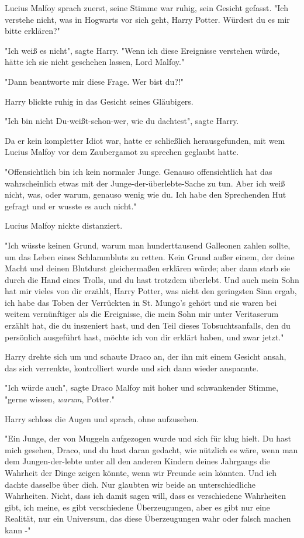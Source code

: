 {Lucius Malfoy sprach zuerst, seine Stimme war ruhig, sein Gesicht gefasst. "Ich verstehe nicht, was in Hogwarts vor sich geht, Harry Potter. Würdest du es mir bitte erklären?"

"Ich weiß es nicht", sagte Harry. "Wenn ich diese Ereignisse verstehen würde, hätte ich sie nicht geschehen lassen, Lord Malfoy."

"Dann beantworte mir diese Frage. Wer bist du?!"

Harry blickte ruhig in das Gesicht seines Gläubigers.

"Ich bin nicht Du-weißt-schon-wer, wie du dachtest", sagte Harry.

Da er kein kompletter Idiot war, hatte er schließlich herausgefunden, mit wem Lucius Malfoy vor dem Zaubergamot zu sprechen geglaubt hatte.

"Offensichtlich bin ich kein normaler Junge. Genauso offensichtlich hat das wahrscheinlich etwas mit der Junge-der-überlebte-Sache zu tun. Aber ich weiß nicht, was, oder warum, genauso wenig wie du. Ich habe den Sprechenden Hut gefragt und er wusste es auch nicht."

Lucius Malfoy nickte distanziert.

"Ich wüsste keinen Grund, warum man hunderttausend Galleonen zahlen sollte, um das Leben eines Schlammbluts zu retten. Kein Grund außer einem, der deine Macht und deinen Blutdurst gleichermaßen erklären würde; aber dann starb sie durch die Hand eines Trolls, und du hast trotzdem überlebt. Und auch mein Sohn hat mir vieles von dir erzählt, Harry Potter, was nicht den geringsten Sinn ergab, ich habe das Toben der Verrückten in St. Mungo's gehört und sie waren bei weitem vernünftiger als die Ereignisse, die mein Sohn mir unter Veritaserum erzählt hat, die du inszeniert hast, und den Teil dieses Tobsuchtsanfalls, den du persönlich ausgeführt hast, möchte ich von dir erklärt haben, und zwar jetzt."

Harry drehte sich um und schaute Draco an, der ihn mit einem Gesicht ansah, das sich verrenkte, kontrolliert wurde und sich dann wieder anspannte.

"Ich würde auch", sagte Draco Malfoy mit hoher und schwankender Stimme, "gerne wissen, \emph{warum}, Potter."

Harry schloss die Augen und sprach, ohne aufzusehen.

"Ein Junge, der von Muggeln aufgezogen wurde und sich für klug hielt. Du hast mich gesehen, Draco, und du hast daran gedacht, wie nützlich es wäre, wenn man dem Jungen-der-lebte unter all den anderen Kindern deines Jahrgangs die Wahrheit der Dinge zeigen könnte, wenn wir Freunde sein könnten. Und ich dachte dasselbe über dich. Nur glaubten wir beide an unterschiedliche Wahrheiten. Nicht, dass ich damit sagen will, dass es verschiedene Wahrheiten gibt, ich meine, es gibt verschiedene Überzeugungen, aber es gibt nur eine Realität, nur ein Universum, das diese Überzeugungen wahr oder falsch machen kann -"

}
